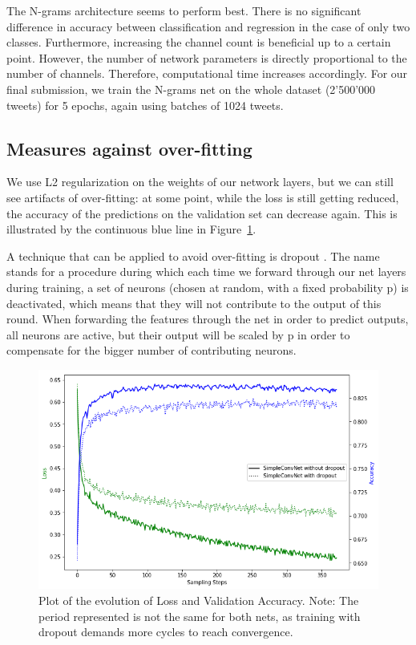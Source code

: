\documentclass[10pt,conference,compsocconf]{IEEEtran}
\begin{document}
The N-grams architecture seems to perform best. There is no significant difference in accuracy between classification and regression in the case of only two classes. Furthermore, increasing the channel count is beneficial up to a certain point. However, the number of network parameters is directly proportional to the number of channels. Therefore, computational time increases accordingly. For our final submission, we train the N-grams net on the whole dataset (2'500'000 tweets) for 5 epochs, again using batches of 1024 tweets.

 \subsection{Measures against over-fitting}
 We use L2 regularization on the weights of our network layers, but we can still see artifacts of over-fitting: at some point, while the loss is still getting reduced, the accuracy of the predictions on the validation set can decrease again. This is illustrated by the continuous blue line in Figure~\ref{fig:Validation accuracy vs Loss}.
 
 A technique that can be applied to avoid over-fitting is dropout \cite{budhiraja_2016}. The name stands for a procedure during which each time we forward through our net layers during training, a set of neurons (chosen at random, with a fixed probability p) is deactivated, which means that they will not contribute to the output of this round. When forwarding the features through the net in order to predict outputs, all neurons are active, but their output will be scaled by p in order to compensate for the bigger number of contributing neurons.
 
 \begin{figure}[H]
  \centering
  \includegraphics[width=\columnwidth]{overfitting}
  \caption{Plot of the evolution of Loss and Validation Accuracy. Note: The period represented is not the same for both nets, as training with dropout demands more cycles to reach convergence.}
  \vspace{-3mm}
  \label{fig:Validation accuracy vs Loss}
\end{figure}
 
\end{document}
